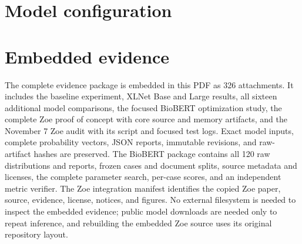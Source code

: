 \documentclass[11pt,a4paper]{article}
\begin{document}
\section{Model configuration}


\section{Embedded evidence}
The complete evidence package is embedded in this PDF as 326 attachments. It includes the baseline experiment, XLNet Base and Large results, all sixteen additional model comparisons, the focused BioBERT optimization study, the complete Zoe proof of concept with core source and memory artifacts, and the November 7 Zoe audit with its script and focused test logs. Exact model inputs, complete probability vectors, JSON reports, immutable revisions, and raw-artifact hashes are preserved. The BioBERT package contains all 120 raw distributions and reports, frozen cases and document splits, source metadata and licenses, the complete parameter search, per-case scores, and an independent metric verifier. The Zoe integration manifest identifies the copied Zoe paper, source, evidence, license, notices, and figures. No external filesystem is needed to inspect the embedded evidence; public model downloads are needed only to repeat inference, and rebuilding the embedded Zoe source uses its original repository layout.
\end{document}
